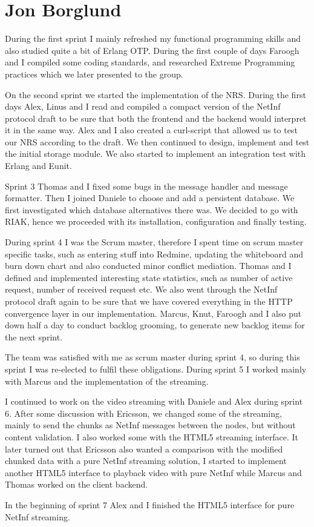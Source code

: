 \section{Jon Borglund}
During the first sprint I mainly refreshed my functional programming skills and also studied quite a bit of Erlang OTP.
During the first couple of days Faroogh and I compiled some coding standards, and researched Extreme Programming practices which we later presented to the group.

On the second sprint we started the implementation of the NRS. During the first days Alex, Linus and I read and compiled a compact version of the NetInf protocol draft to be sure that both the frontend and the backend would interpret it in the same way. Alex and I also created a curl-script that allowed us to test our NRS according to the draft. 
We then continued to design, implement and test the initial storage module. 
We also started to implement an integration test with Erlang and Eunit.

Sprint 3 Thomas and I fixed some bugs in the message handler and message formatter. Then I joined Daniele to choose and add a persistent database. We first investigated which database alternatives there was. We decided to go with RIAK, hence we proceeded with its installation, configuration and finally testing.

During sprint 4 I was the Scrum master, therefore I spent time on scrum master specific tasks, such as entering stuff into Redmine, updating the whiteboard and burn down chart and also conducted minor conflict mediation. 
Thomas and I defined and implemented interesting state statistics, such as number of active request, number of received request etc. We also went through the NetInf protocol draft again to be sure that we have covered everything in the HTTP convergence layer in our implementation.  Marcus, Knut, Faroogh and I also put down half a day to conduct backlog grooming, to generate new backlog items for the next sprint. 

The team was satisfied with me as scrum master during sprint 4, so during this sprint I was re-elected to fulfil these obligations. 
During sprint 5 I worked mainly with Marcus and the implementation of the streaming. 

I continued to work on the video streaming with Daniele and Alex during sprint 6. After some discussion with Ericsson, we changed some of the streaming, mainly to send the chunks as NetInf messages between the nodes, but without content validation. I also worked some with the HTML5 streaming interface. 
It later turned out that Ericsson also wanted a comparison with the modified chunked data with a pure NetInf streaming solution, I started to implement another HTML5 interface to playback video with pure NetInf while Marcus and Thomas worked on the client backend.

In the beginning of sprint 7 Alex and I finished the HTML5 interface for pure NetInf streaming.